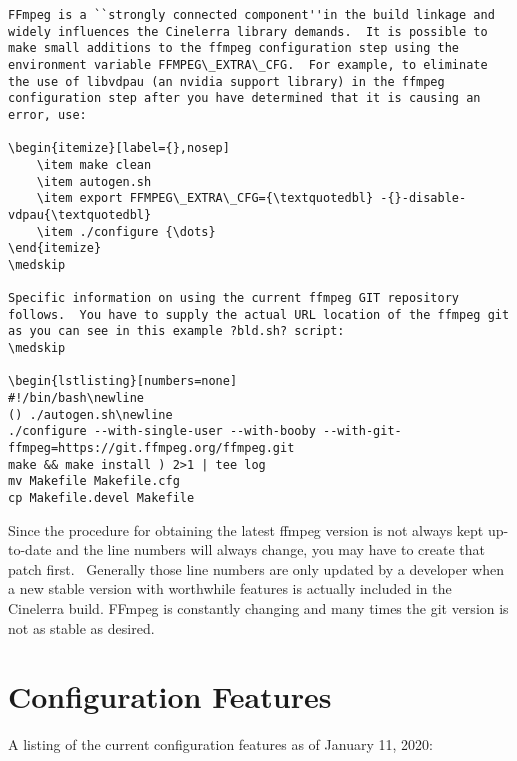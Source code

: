 \begin{lstlisting}[numbers=none]
FFmpeg is a ``strongly connected component''in the build linkage and widely influences the Cinelerra library demands.  It is possible to make small additions to the ffmpeg configuration step using the environment variable FFMPEG\_EXTRA\_CFG.  For example, to eliminate the use of libvdpau (an nvidia support library) in the ffmpeg configuration step after you have determined that it is causing an error, use:

\begin{itemize}[label={},nosep]
	\item make clean
	\item autogen.sh
	\item export FFMPEG\_EXTRA\_CFG={\textquotedbl} -{}-disable-vdpau{\textquotedbl} 
	\item ./configure {\dots}
\end{itemize}
\medskip

Specific information on using the current ffmpeg GIT repository follows.  You have to supply the actual URL location of the ffmpeg git as you can see in this example ?bld.sh? script:
\medskip

\begin{lstlisting}[numbers=none]
#!/bin/bash\newline
() ./autogen.sh\newline
./configure --with-single-user --with-booby --with-git-ffmpeg=https://git.ffmpeg.org/ffmpeg.git
make && make install ) 2>1 | tee log
mv Makefile Makefile.cfg
cp Makefile.devel Makefile
\end{lstlisting}

Since the procedure for obtaining the latest ffmpeg version is not always kept up-to-date and the line numbers will always change, you may have to create that patch first. \ Generally those line numbers are only updated by a developer when a new stable version with worthwhile features is actually included in the Cinelerra build. FFmpeg is constantly changing and many times the git version is not as stable as desired.

\section{Configuration Features}
\label{sec:Configuration Features}

A listing of the current configuration features as of January 11, 2020:

